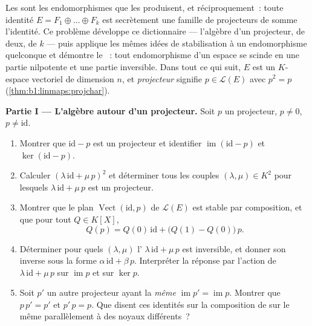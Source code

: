 \begin{problem}\label{pb:b1:linmaps:1}
Les  sont les endomorphismes que les  produisent, et
réciproquement~: toute identité $E = F_1 \oplus \dots \oplus F_k$ est
secrètement une famille de projecteurs de somme l'identité. Ce
problème développe ce dictionnaire --- l'algèbre d'un
projecteur, de deux, de $k$ --- puis applique les mêmes idées de
stabilisation à un endomorphisme quelconque et démontre le
\emph{}~: tout endomorphisme d'un espace  se scinde en une partie nilpotente et une
partie inversible. Dans tout ce qui suit, $E$ est un $K$-espace vectoriel de
dimension $n$, et \emph{projecteur} signifie $p \in \mathcal{L}(E)$
avec $p^2 = p$ (\cref{thm:b1:linmaps:projchar}).

\medskip
\noindent\textbf{Partie I --- L'algèbre autour d'un projecteur.}
Soit $p$ un projecteur, $p \neq 0$, $p \neq \mathrm{id}$.
\begin{enumerate}
  \item Montrer que $\mathrm{id} - p$ est un projecteur et identifier
        $\operatorname{im}(\mathrm{id} - p)$ et
        $\ker(\mathrm{id} - p)$.
  \item Calculer $(\lambda\,\mathrm{id} + \mu\,p)^2$ et déterminer
        tous les couples $(\lambda, \mu) \in K^2$ pour lesquels
        $\lambda\,\mathrm{id} + \mu\,p$ est un projecteur.
  \item Montrer que le plan $\operatorname{Vect}(\mathrm{id}, p)$
        de $\mathcal{L}(E)$ est stable par composition, et que
        pour tout  $Q \in K[X]$,
        \[
        Q(p) = Q(0)\,\mathrm{id} + \bigl(Q(1) -
        Q(0)\bigr)\,p .
        \]
  \item Déterminer pour quels $(\lambda, \mu)$ l'
        $\lambda\,\mathrm{id} + \mu\,p$ est inversible, et donner
        son inverse sous la forme $\alpha\,\mathrm{id} + \beta\,p$.
        Interpréter la réponse par l'action de
        $\lambda\,\mathrm{id} + \mu\,p$ sur $\operatorname{im} p$
        et sur $\ker p$.
  \item Soit $p'$ un autre projecteur ayant la \emph{même }
        $\operatorname{im} p' = \operatorname{im} p$. Montrer que
        $p\,p' = p'$ et $p'\,p = p$. Que disent ces identités
        sur la composition de  sur le même 
        parallèlement à des noyaux différents~?
\end{enumerate}


\end{problem}
